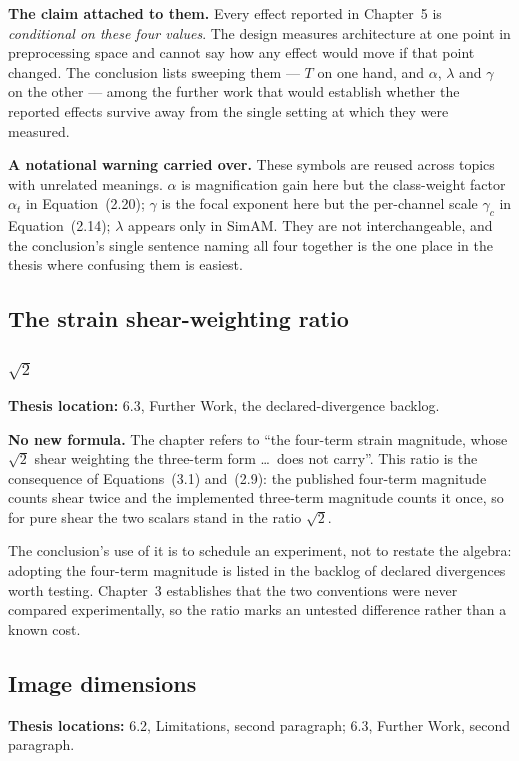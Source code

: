 \documentclass[11pt,a4paper]{article}
\numberwithin{equation}{section}
\begin{document}
\textbf{The claim attached to them.} Every effect reported in Chapter~5 is
\emph{conditional on these four values}. The design measures architecture at
one point in preprocessing space and cannot say how any effect would move if
that point changed. The conclusion lists sweeping them --- $T$ on one hand,
and $\alpha$, $\lambda$ and $\gamma$ on the other --- among the further work
that would establish whether the reported effects survive away from the single
setting at which they were measured.

\textbf{A notational warning carried over.} These symbols are reused across
topics with unrelated meanings. $\alpha$ is magnification gain here but the
class-weight factor $\alpha_t$ in Equation~(2.20); $\gamma$ is the focal
exponent here but the per-channel scale $\gamma_c$ in Equation~(2.14);
$\lambda$ appears only in SimAM. They are not interchangeable, and the
conclusion's single sentence naming all four together is the one place in the
thesis where confusing them is easiest.

\subsection{The strain shear-weighting ratio}

\subsubsection{\texorpdfstring{$\sqrt{2}$}{sqrt(2)}}
\label{fg6:sqrt2}
\textbf{Thesis location:} 6.3, Further Work, the declared-divergence backlog.

\textbf{No new formula.} The chapter refers to ``the four-term strain
magnitude, whose $\sqrt{2}$ shear weighting the three-term form \ldots\ does
not carry''. This ratio is the consequence of Equations~(3.1)
and~(2.9): the published four-term magnitude counts shear twice and the
implemented three-term magnitude counts it once, so for pure shear the two
scalars stand in the ratio $\sqrt{2}$.

The conclusion's use of it is to schedule an experiment, not to restate the
algebra: adopting the four-term magnitude is listed in the backlog of declared
divergences worth testing. Chapter~3 establishes that the two conventions were
never compared experimentally, so the ratio marks an untested difference
rather than a known cost.

\subsection{Image dimensions}
\label{fg6:dimensions}
\textbf{Thesis locations:} 6.2, Limitations, second paragraph; 6.3, Further
Work, second paragraph.
\end{document}
